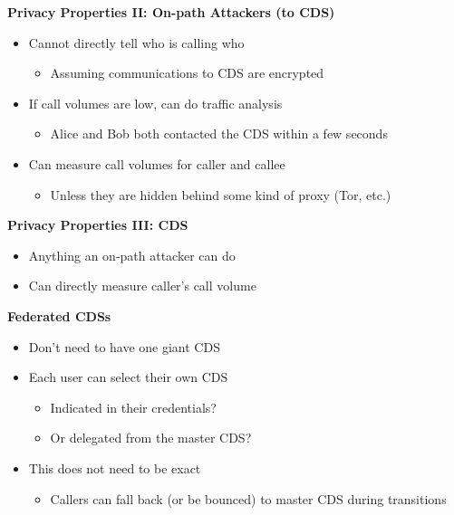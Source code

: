 \documentclass[helvetica]{seminar}
\newcommand{\heading}[1]{%
  \begin{center} 
    \large\bf 
    #1 
  \end{center} 
  \vspace{.4 in}}
\begin{document}
\begin{slide}
\heading{Privacy Properties II: On-path Attackers (to CDS)}

\begin{itemize}
\item Cannot directly tell who is calling who
  \begin{itemize}
  \item Assuming communications to CDS are encrypted
  \end{itemize}

\item If call volumes are low, can do traffic analysis
  \begin{itemize}
  \item Alice and Bob both contacted the CDS within a few seconds
  \end{itemize}

\item Can measure call volumes for caller and callee
  \begin{itemize}
  \item Unless they are hidden behind some kind of proxy (Tor, etc.)
  \end{itemize}
\end{itemize}
\end{slide}


\begin{slide}
\heading{Privacy Properties III: CDS}

\begin{itemize}
\item Anything an on-path attacker can do
\item Can directly measure caller's call volume
\end{itemize}
\end{slide}


\begin{slide}
\heading{Federated CDSs}

\begin{itemize}
\item Don't need to have one giant CDS
\item Each user can select their own CDS
  \begin{itemize}
  \item Indicated in their credentials?
  \item Or delegated from the master CDS?
  \end{itemize}

\item This does not need to be exact
  \begin{itemize}
  \item Callers can fall back (or be bounced) to master CDS during transitions
  \end{itemize}
\end{itemize}

\end{slide}
\end{document}
